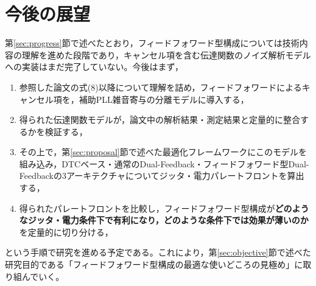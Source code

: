 \section{今後の展望}
\label{sec:future}

第\ref{sec:progress}節で述べたとおり，フィードフォワード型構成については技術内容の理解を進めた段階であり，キャンセル項を含む伝達関数のノイズ解析モデルへの実装はまだ完了していない。今後はまず，

\begin{enumerate}
  \item 参照した論文\cite{zhang_ffnc_2025}の式(8)以降について理解を詰め，フィードフォワードによるキャンセル項を，補助PLL雑音寄与の分離モデルに導入する，
  \item 得られた伝達関数モデルが，論文中の解析結果・測定結果と定量的に整合するかを検証する，
  \item その上で，第\ref{sec:proposal}節で述べた最適化フレームワークにこのモデルを組み込み，DTCベース・通常のDual-Feedback・フィードフォワード型Dual-Feedbackの3アーキテクチャについてジッタ・電力パレートフロントを算出する，
  \item 得られたパレートフロントを比較し，フィードフォワード型構成が\textbf{どのようなジッタ・電力条件下で有利になり，どのような条件下では効果が薄いのか}を定量的に切り分ける，
\end{enumerate}

という手順で研究を進める予定である。これにより，第\ref{sec:objective}節で述べた研究目的である「フィードフォワード型構成の最適な使いどころの見極め」に取り組んでいく。

